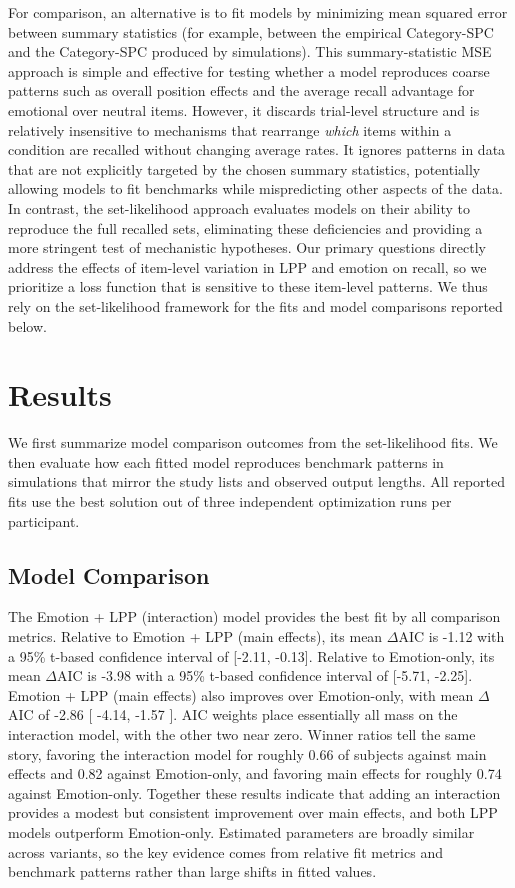\documentclass[
  man,
  longtable,
  nolmodern,
  notxfonts,
  notimes,
  draftfirst,
  colorlinks=true,linkcolor=blue,citecolor=blue,urlcolor=blue]{apa7}
\begin{document}
For comparison, an alternative is to fit models by minimizing mean
squared error between summary statistics (for example, between the
empirical Category-SPC and the Category-SPC produced by simulations).
This summary-statistic MSE approach is simple and effective for testing
whether a model reproduces coarse patterns such as overall position
effects and the average recall advantage for emotional over neutral
items. However, it discards trial-level structure and is relatively
insensitive to mechanisms that rearrange \emph{which} items within a
condition are recalled without changing average rates. It ignores
patterns in data that are not explicitly targeted by the chosen summary
statistics, potentially allowing models to fit benchmarks while
mispredicting other aspects of the data. In contrast, the set-likelihood
approach evaluates models on their ability to reproduce the full
recalled sets, eliminating these deficiencies and providing a more
stringent test of mechanistic hypotheses. Our primary questions directly
address the effects of item-level variation in LPP and emotion on
recall, so we prioritize a loss function that is sensitive to these
item-level patterns. We thus rely on the set-likelihood framework for
the fits and model comparisons reported below.

\section{Results}\label{results}

We first summarize model comparison outcomes from the set-likelihood
fits. We then evaluate how each fitted model reproduces benchmark
patterns in simulations that mirror the study lists and observed output
lengths. All reported fits use the best solution out of three
independent optimization runs per participant.

\subsection{Model Comparison}\label{model-comparison}

The Emotion + LPP (interaction) model provides the best fit by all
comparison metrics. Relative to Emotion + LPP (main effects), its mean
\(\Delta\)AIC is -1.12 with a 95\% t-based confidence interval of
{[}-2.11, -0.13{]}. Relative to Emotion-only, its mean \(\Delta\)AIC is
-3.98 with a 95\% t-based confidence interval of {[}-5.71, -2.25{]}.
Emotion + LPP (main effects) also improves over Emotion-only, with mean
\(\Delta\)AIC of -2.86 {[} -4.14, -1.57 {]}. AIC weights place
essentially all mass on the interaction model, with the other two near
zero. Winner ratios tell the same story, favoring the interaction model
for roughly 0.66 of subjects against main effects and 0.82 against
Emotion-only, and favoring main effects for roughly 0.74 against
Emotion-only. Together these results indicate that adding an interaction
provides a modest but consistent improvement over main effects, and both
LPP models outperform Emotion-only. Estimated parameters are broadly
similar across variants, so the key evidence comes from relative fit
metrics and benchmark patterns rather than large shifts in fitted
values.
\end{document}
